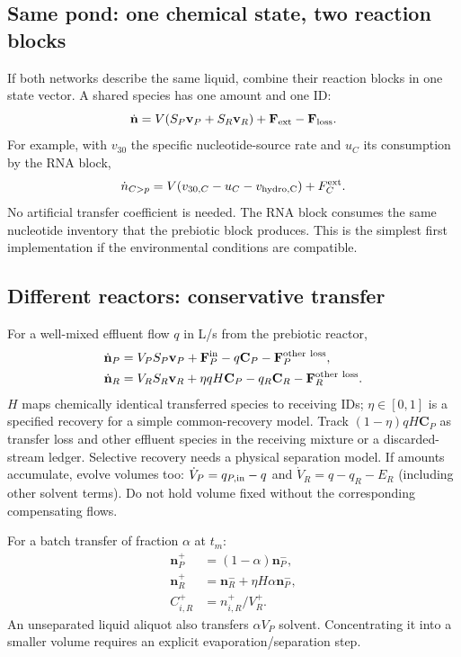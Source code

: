 \documentclass[11pt]{article}
\newcommand{\cp}{\mathord{>}p}
\begin{document}
\subsection{Same pond: one chemical state, two reaction blocks}
If both networks describe the same liquid, combine their reaction blocks in one
state vector. A shared species has one amount and one ID:
\begin{equation}
\dot{\mathbf n}=V(S_P\mathbf v_P+S_R\mathbf v_R)
+\mathbf F_{\rm ext}-\mathbf F_{\rm loss}.
\label{same}
\end{equation}
For example, with $v_{30}$ the specific nucleotide-source rate and $u_C$ its
consumption by the RNA block,
\begin{equation}
\dot n_{C\cp}=V(v_{30,C}-u_C-v_{\rm hydro,C})+F_C^{\rm ext}.
\end{equation}
No artificial transfer coefficient is needed. The RNA block consumes the same
nucleotide inventory that the prebiotic block produces. This is the simplest
first implementation if the environmental conditions are compatible.

\subsection{Different reactors: conservative transfer}
For a well-mixed effluent flow $q$ in L/s from the prebiotic reactor,
\begin{align}
\dot{\mathbf n}_P&=V_PS_P\mathbf v_P+\mathbf F_P^{\rm in}
-q\mathbf C_P-\mathbf F_P^{\rm other\ loss},\\
\dot{\mathbf n}_R&=V_RS_R\mathbf v_R+\eta qH\mathbf C_P
-q_R\mathbf C_R-\mathbf F_R^{\rm other\ loss}.
\label{transfer}
\end{align}
$H$ maps chemically identical transferred species to receiving IDs;
$\eta\in[0,1]$ is a specified recovery for a simple common-recovery model. Track
$(1-\eta)qH\mathbf C_P$ as transfer loss and other effluent species in the
receiving mixture or a discarded-stream ledger. Selective recovery needs a
physical separation model. If amounts accumulate, evolve volumes too:
$\dot V_P=q_{P,\rm in}-q$ and $\dot V_R=q-q_R-E_R$ (including other solvent terms).
Do not hold volume fixed without the corresponding compensating flows.

For a batch transfer of fraction $\alpha$ at $t_m$:
\begin{align}
\mathbf n_P^+&=(1-\alpha)\mathbf n_P^-,\\
\mathbf n_R^+&=\mathbf n_R^-+\eta H\alpha\mathbf n_P^-,\\
C_{i,R}^+&=n_{i,R}^+/V_R^+.
\end{align}
An unseparated liquid aliquot also transfers $\alpha V_P$ solvent. Concentrating
it into a smaller volume requires an explicit evaporation/separation step.
\end{document}
